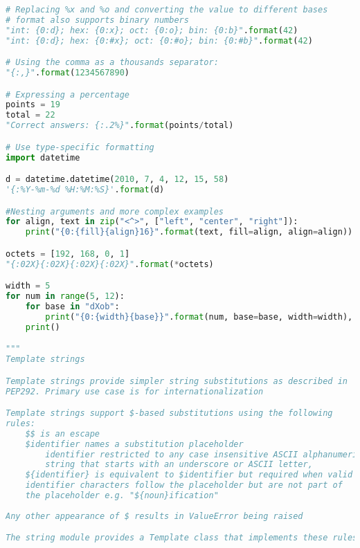 \documentclass[a4paper,landscape]{report}
\begin{document}
\begin{lstlisting}[language=Python]
# Replacing %x and %o and converting the value to different bases
# format also supports binary numbers
"int: {0:d}; hex: {0:x}; oct: {0:o}; bin: {0:b}".format(42)
"int: {0:d}; hex: {0:#x}; oct: {0:#o}; bin: {0:#b}".format(42)

# Using the comma as a thousands separator:
"{:,}".format(1234567890)

# Expressing a percentage
points = 19
total = 22
"Correct answers: {:.2%}".format(points/total)

# Use type-specific formatting
import datetime

d = datetime.datetime(2010, 7, 4, 12, 15, 58)
'{:%Y-%m-%d %H:%M:%S}'.format(d)

#Nesting arguments and more complex examples
for align, text in zip("<^>", ["left", "center", "right"]):
    print("{0:{fill}{align}16}".format(text, fill=align, align=align))

octets = [192, 168, 0, 1]
"{:02X}{:02X}{:02X}{:02X}".format(*octets)

width = 5
for num in range(5, 12):
    for base in "dXob":
        print("{0:{width}{base}}".format(num, base=base, width=width), end=" ")
    print()

"""
Template strings

Template strings provide simpler string substitutions as described in
PEP292. Primary use case is for internationalization

Template strings support $-based substitutions using the following
rules:
    $$ is an escape
    $identifier names a substitution placeholder
        identifier restricted to any case insensitive ASCII alphanumeric
        string that starts with an underscore or ASCII letter,
    ${identifier} is equivalent to $identifier but required when valid
    identifier characters follow the placeholder but are not part of
    the placeholder e.g. "${noun}ification"
    
Any other appearance of $ results in ValueError being raised

The string module provides a Template class that implements these rules


\end{lstlisting}
\end{document}
